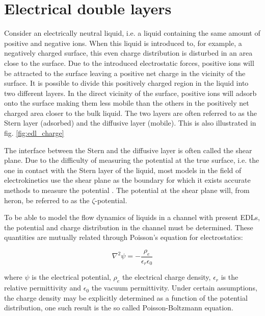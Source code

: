 \section{Electrical double layers}
Consider an electrically neutral liquid, i.e. a liquid containing the
same amount of positive and negative ions. When this liquid is
introduced to, for example, a negatively charged surface, this even
charge distribution is disturbed in an area close to the surface. Due
to the introduced electrostatic forces, positive ions will be
attracted to the surface leaving a positive net charge in the vicinity
of the surface. It is possible to divide this positively charged
region in the liquid into two different layers. In the direct vicinity
of the surface, positive ions will adsorb onto the surface making them
less mobile than the others in the positively net charged area closer
to the bulk liquid. The two layers are often referred to as the Stern
layer (adsorbed) and the diffusive layer (mobile). This is also
illustrated in fig. \ref{fig:edl_charge} \cite{ren_book}

The interface between the Stern and the diffusive layer is often
called the shear plane. Due to the difficulty of measuring the
potential at the true surface, i.e. the one in contact with the Stern
layer of the liquid, most models in the field of electrokinetics use
the shear plane as the boundary for which it exists accurate methods
to measure the potential \cite{ren_book}. The potential at the shear
plane will, from heron, be referred to as the $\zeta$-potential.

To be able to model the flow dynamics of liquids in a channel with
present EDLs, the potential and charge distribution in the channel
must be determined. These quantities are mutually related through
Poisson's equation for electrostatics:

\begin{equation}\label{eq:pb}
\nabla^2\psi = -\frac{\rho_e}{\epsilon_r \epsilon_0}
\end{equation}

where $\psi$ is the electrical potential, $\rho_e$ the electrical
charge density, $\epsilon_r$ is the relative permittivity and
$\epsilon_0$ the vacuum permittivity. Under certain assumptions, the
charge density may be explicitly determined as a function of the
potential distribution, one such result is the so called
Poisson-Boltzmann equation.



